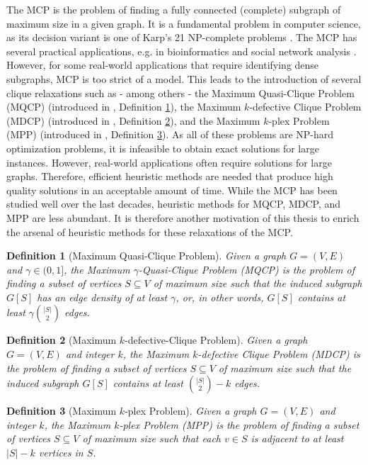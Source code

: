 \documentclass [11pt]{article}
\newtheorem{definition}{Definition}[section]
\begin{document}
The MCP is the problem of finding a fully connected (complete) subgraph of maximum size in a given graph. It is a fundamental problem in computer science, as its decision variant is one of Karp's 21 NP-complete problems \cite{Karp1972}. The MCP has several practical applications, e.g. in bioinformatics \cite{Dognin2010} and social network analysis \cite{Pattillo_network_analysis_2013}. However, for some real-world applications that require identifying dense subgraphs, MCP is too strict of a model. This leads to the introduction of several clique relaxations such as - among others - the Maximum Quasi-Clique Problem (MQCP) (introduced in \cite{Abello2002}, Definition \ref{def:mqcp}), the Maximum $k$-defective Clique Problem (MDCP) (introduced in \cite{Yu2006}, Definition \ref{def:mdcp}), and the Maximum $k$-plex Problem (MPP) (introduced in \cite{Seidman1978}, Definition \ref{def:mpp}). 
As all of these problems are NP-hard optimization problems, it is infeasible to obtain exact solutions for large instances. However, real-world applications often require solutions for large graphs. Therefore, efficient heuristic methods are needed that produce high quality solutions in an acceptable amount of time. While the MCP has been studied well over the last decades, heuristic methods for MQCP, MDCP, and MPP are less abundant. It is therefore another motivation of this thesis to enrich the arsenal of heuristic methods for these relaxations of the MCP. 

\begin{definition}[Maximum Quasi-Clique Problem]
	\label{def:mqcp}
	Given a graph $G = (V,E)$ and $\gamma \in (0,1]$, the Maximum $\gamma$-Quasi-Clique Problem (MQCP) is the problem of finding a subset of vertices $S \subseteq V$ of maximum size 
	such that the induced subgraph $G[S]$ has an edge density of at least $\gamma$, or, in other words, $G[S]$ contains at least $\gamma { |S| \choose 2 }$ edges. 
\end{definition}

\begin{definition}[Maximum $k$-defective-Clique Problem]
	\label{def:mdcp}
	Given a graph $G = (V,E)$ and integer $k$, the Maximum $k$-defective Clique Problem (MDCP) is the problem of finding a subset of vertices $S \subseteq V$ of maximum size 
	such that the induced subgraph $G[S]$ contains at least ${|S| \choose 2} - k$ edges. 
\end{definition}

\begin{definition}[Maximum $k$-plex Problem]
	\label{def:mpp}
	Given a graph $G = (V,E)$ and integer $k$, the Maximum $k$-plex Problem (MPP) is the problem of finding a subset of vertices $S \subseteq V$ of maximum size 
	such that each $v \in S$ is adjacent to at least $|S| - k$ vertices in $S$. 
\end{definition}
\end{document}
